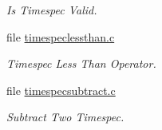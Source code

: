 \begin{DoxyCompactItemize}
\begin{DoxyCompactList}\small\item\em Is Timespec Valid. \end{DoxyCompactList}\item 
file \mbox{\hyperlink{timespeclessthan_8c}{timespeclessthan.\+c}}
\begin{DoxyCompactList}\small\item\em Timespec Less Than Operator. \end{DoxyCompactList}\item 
file \mbox{\hyperlink{timespecsubtract_8c}{timespecsubtract.\+c}}
\begin{DoxyCompactList}\small\item\em Subtract Two Timespec. \end{DoxyCompactList}\end{DoxyCompactItemize}
